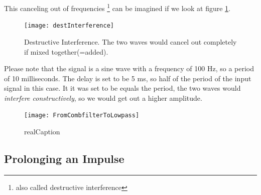 
This canceling out of frequencies \footnote{also called destructive interference} can be imagined if we look at figure \ref{fig:destIntereference}. 
\begin{figure}[H]
	\centering
	\texttt{[image: destInterference]}
	\caption[Destructive Interference]
	{Destructive Interference. The two waves would cancel out completely if mixed together(=added).}
	\label{fig:destIntereference}
\end{figure}

Please note that the signal is a sine wave with a frequency of 100 Hz, so a period of 10 milliseconds. The delay is set to be 5 ms, so half of the period of the input signal in this case. It it was set to be equals the period, the two waves would \textit{interfere constructively}, so we would get out a higher amplitude. \\



\begin{figure}[H]
	\centering
	\texttt{[image: FromCombfilterToLowpass]}
	\caption[shortCaption]
	{realCaption}
	\label{fig:label}
\end{figure}

\subsection{Prolonging an Impulse}
















